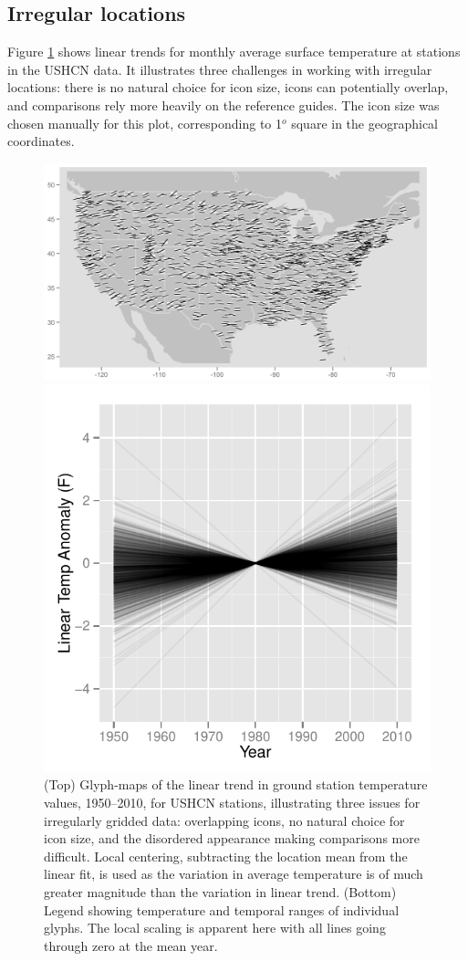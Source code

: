 \documentclass[oneside]{article}
\begin{document}
\subsection{Irregular locations}
Figure \ref{fig:irregular} shows linear trends for monthly average surface temperature at stations in the USHCN data.  It illustrates three challenges in working with irregular locations: there is no natural choice for icon size, icons can potentially overlap, and comparisons rely more heavily on the reference guides.  The icon size was chosen manually for this plot, corresponding to 1$^o$ square in the geographical coordinates. 
\begin{figure}[htbp]
  \centering
  \includegraphics[width=1\linewidth]{usa-lin-overlap}%

\includegraphics[width=0.33\linewidth]{usa-lin-legend}
  \caption{(Top) Glyph-maps of the linear trend in ground station temperature values, 1950--2010, for USHCN stations, illustrating three issues for irregularly gridded data: overlapping icons, no natural choice for icon size, and the disordered appearance making comparisons more difficult. Local centering, subtracting the location mean from the linear fit, is used as the variation in average temperature is of much greater magnitude than the variation in linear trend. (Bottom) Legend showing
    temperature and temporal ranges of individual glyphs. The local scaling is apparent here with all lines going through zero at the mean year. }%
  \label{fig:irregular}
\end{figure}
\end{document}
